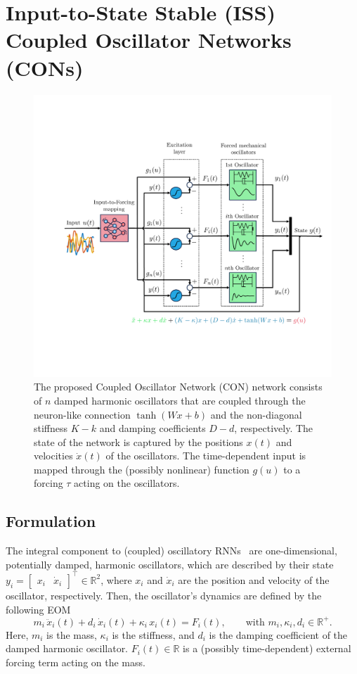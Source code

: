 \section{Input-to-State Stable (ISS) Coupled Oscillator Networks (CONs)}\label{sec:con:con}

\begin{figure}[t]
    \centering
    \includegraphics[width=0.8\linewidth]{con/figures/con/blockdiagram_coupled_oscillator_network_v2_cropped.pdf}
    \caption{The proposed Coupled Oscillator Network (CON) network consists of $n$ damped harmonic oscillators that are coupled through the neuron-like connection $\tanh(Wx+b)$ and the non-diagonal stiffness $K-k$ and damping coefficients $D-d$, respectively. The state of the network is captured by the positions $x(t)$ and velocities $\dot{x}(t)$ of the oscillators. The time-dependent input is mapped through the (possibly nonlinear) function $g(u)$ to a forcing $\tau$ acting on the oscillators.}
    \label{fig:con:con}
\end{figure}

\subsection{Formulation} 
The integral component to (coupled) oscillatory \glspl{RNN}~\citep{rusch2020coupled, rusch2021unicornn, ceni2024random, lanthaler2024neural} are one-dimensional, potentially damped, harmonic oscillators, which are described by their state $y_i = \begin{bmatrix}
    x_i & \dot{x}_i
\end{bmatrix}^\top \in \mathbb{R}^2$, where $x_i$ and $\dot{x}_i$ are the position and velocity of the oscillator, respectively. Then, the oscillator's dynamics are defined by the following \gls{EOM}
\begin{equation}\label{eq:con:harmonic_oscillator}
    m_i \, \ddot{x}_i(t) + d_i \, \dot{x}_i(t) + \kappa_i \, x_i(t) = F_i(t),
    \qquad
    \text{with } m_i, \kappa_i, d_i \in \mathbb{R}^+.
\end{equation}
Here, $m_i$ is the mass, $\kappa_i$ is the stiffness, and $d_i$ is the damping coefficient of the damped harmonic oscillator. $F_i(t) \in \mathbb{R}$ is a (possibly time-dependent) external forcing term acting on the mass.

